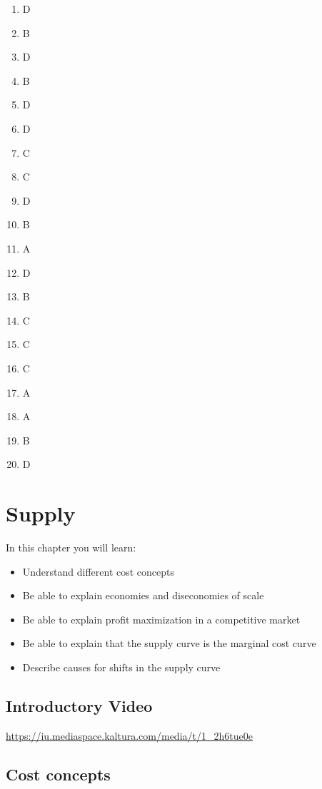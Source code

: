 \documentclass[
]{book}
\providecommand{\tightlist}{%
  \setlength{\itemsep}{0pt}\setlength{\parskip}{0pt}}
\begin{document}
\begin{enumerate}
\def\labelenumi{\arabic{enumi}.}
\tightlist
\item
  D
\item
  B
\item
  D
\item
  B
\item
  D
\item
  D
\item
  C
\item
  C
\item
  D
\item
  B
\item
  A
\item
  D
\item
  B
\item
  C
\item
  C
\item
  C
\item
  A
\item
  A
\item
  B
\item
  D
\end{enumerate}

\hypertarget{supply}{%
\chapter{Supply}\label{supply}}

In this chapter you will learn:

\begin{itemize}
\tightlist
\item
  Understand different cost concepts
\item
  Be able to explain economies and diseconomies of scale
\item
  Be able to explain profit maximization in a competitive market
\item
  Be able to explain that the supply curve is the marginal cost curve
\item
  Describe causes for shifts in the supply curve
\end{itemize}

\hypertarget{introductory-video-1}{%
\section{Introductory Video}\label{introductory-video-1}}

\url{https://iu.mediaspace.kaltura.com/media/t/1_2h6tue0e}

\hypertarget{cost-concepts}{%
\section{Cost concepts}\label{cost-concepts}}
\end{document}
